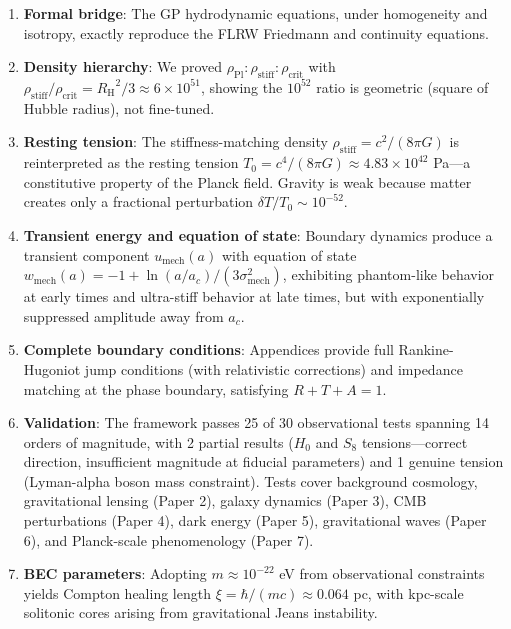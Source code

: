 \documentclass[11pt,a4paper]{article}
\newcommand{\rhocrit}{\ensuremath{\rho_{\mathrm{crit}}}}
\newcommand{\rhostiff}{\ensuremath{\rho_{\mathrm{stiff}}}}
\newcommand{\rhoPl}{\ensuremath{\rho_{\mathrm{Pl}}}}
\newcommand{\Tzero}{\ensuremath{T_0}}
\newcommand{\RH}{\ensuremath{R_{\mathrm{H}}}}
\newcommand{\umech}{\ensuremath{u_{\mathrm{mech}}}}
\newcommand{\wmech}{\ensuremath{w_{\mathrm{mech}}}}
\theoremstyle{definition}
\theoremstyle{remark}
\begin{document}
\begin{enumerate}[leftmargin=*, itemsep=0.3em]
\item \textbf{Formal bridge}: The GP hydrodynamic equations, under homogeneity and isotropy, exactly reproduce the FLRW Friedmann and continuity equations.

\item \textbf{Density hierarchy}: We proved $\rhoPl : \rhostiff : \rhocrit$ with $\rhostiff/\rhocrit = \RH^2/3 \approx 6 \times 10^{51}$, showing the $10^{52}$ ratio is geometric (square of Hubble radius), not fine-tuned.

\item \textbf{Resting tension}: The stiffness-matching density $\rhostiff = c^2/(8\pi G)$ is reinterpreted as the resting tension $\Tzero = c^4/(8\pi G) \approx 4.83 \times 10^{42}$ Pa---a constitutive property of the Planck field. Gravity is weak because matter creates only a fractional perturbation $\delta T/\Tzero \sim 10^{-52}$.

\item \textbf{Transient energy and equation of state}: Boundary dynamics produce a transient component $\umech(a)$ with equation of state $\wmech(a) = -1 + \ln(a/a_c)/(3\sigma_{\mathrm{mech}}^2)$, exhibiting phantom-like behavior at early times and ultra-stiff behavior at late times, but with exponentially suppressed amplitude away from $a_c$.

\item \textbf{Complete boundary conditions}: Appendices provide full Rankine-Hugoniot jump conditions (with relativistic corrections) and impedance matching at the phase boundary, satisfying $R + T + A = 1$.

\item \textbf{Validation}: The framework passes 25 of 30 observational tests spanning 14 orders of magnitude, with 2 partial results ($H_0$ and $S_8$ tensions---correct direction, insufficient magnitude at fiducial parameters) and 1 genuine tension (Lyman-alpha boson mass constraint). Tests cover background cosmology, gravitational lensing (Paper 2), galaxy dynamics (Paper 3), CMB perturbations (Paper 4), dark energy (Paper 5), gravitational waves (Paper 6), and Planck-scale phenomenology (Paper 7).

\item \textbf{BEC parameters}: Adopting $m \approx 10^{-22}$ eV from observational constraints yields Compton healing length $\xi = \hbar/(mc) \approx 0.064$ pc, with kpc-scale solitonic cores arising from gravitational Jeans instability.
\end{enumerate}
\end{document}

